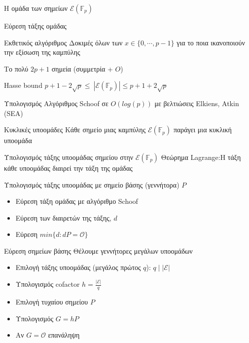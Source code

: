 \documentclass[handout]{beamer}
\begin{document}
\begin{frame}[allowframebreaks]{Η ομάδα των σημείων $\mathcal{E}(\mathbb{F}_p)$}

Εύρεση τάξης ομάδας

\begin{block}{Εκθετικός αλγόριθμος}
Δοκιμές όλων των $x \in \{0, \cdots, p-1\}$ για το ποια ικανοποιούν την εξίσωση της καμπύλης

Το πολύ $2p+1$ σημεία (συμμετρία + $\mathcal{Ο}$)
\end{block}

\begin{block}{Hasse bound}
$ p+1-2\sqrt{p} \leq\ | \mathcal E(\mathbb{F}_p) | \leq p+1+2\sqrt{p}$
\end{block}

\begin{block}{Υπολογισμός}
Αλγόριθμος Schoof σε $O(log(p))$ με βελτιώσεις Elkiens, Atkin (SEA)
\end{block}

\framebreak
\begin{block}{Κυκλικές υποομάδες}
Κάθε σημείο μιας καμπύλης $\mathcal{E}(\mathbb{F}_p)$ παράγει μια κυκλική υποομάδα
\end{block}
\pause
\begin{block}{Υπολογισμός τάξης υποομάδας σημείου στην $\mathcal{E}(\mathbb{F}_p)$}
Θεώρημα Lagrange:Η τάξη κάθε υποομάδας διαιρεί την τάξη της ομάδας
\pause

Υπολογισμός τάξης υποομάδας με σημείο βάσης (γεννήτορα) $P$
\begin{itemize}
\item Εύρεση τάξη ομάδας με αλγόριθμο Schoof \pause
\item Εύρεση των διαιρετών της τάξης, $d$ \pause
\item Εύρεση $min \{d: dP = \mathcal{O}\}$
\end{itemize}
\end{block}

\framebreak

\begin{block}{Εύρεση σημείων βάσης}
Θέλουμε γεννήτορες μεγάλων υποομάδων

\begin{itemize}
\item Επιλογή τάξης υποομάδας (μεγάλος πρώτος $q$): $q \mid |\mathcal{E}|$
\item Υπολογισμός cofactor $h=\frac{|\mathcal{E}|}{q}$
\item Επιλογή τυχαίου σημείου $P$
\item Υπολογισμός $G = hP$
\item Αν $G = \mathcal{O}$ επανάληψη
\end{itemize}
\end{block}

\end{frame}
\end{document}
